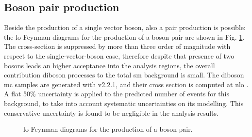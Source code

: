 \subsection{Boson pair production}

Beside the production of a single vector boson, also a pair production is possible: 
the \gls{lo} Feynman diagrams for the production of a boson pair are shown in Fig. \ref{fig:dib_prod}.
The cross-section is suppressed by more than three order of magnitude with respect to the 
single-vector-boson case, therefore despite that presence of two bosons leads an higher acceptance into the analysis regions,
the overall contribution diboson processes to the total \gls{sm} background is small. 
The diboson \gls{mc} samples are generated with \Sherpa v2.2.1, and their cross section is computed at \gls{nlo} \cite{ATL-PHYS-PUB-2016-002,ATL-PHYS-PUB-2017-005}.
A flat 50\% uncertainty is applied to the predicted number of events for this background, to take into account 
systematic uncertainties on its modelling. This conservative uncertainty is found to be negligible in the analysis results. 


\begin{figure}[h!]
\centering 
{}
\caption{\gls{lo} Feynman diagrams for the production of a boson pair.}\label{fig:dib_prod}
\end{figure}


